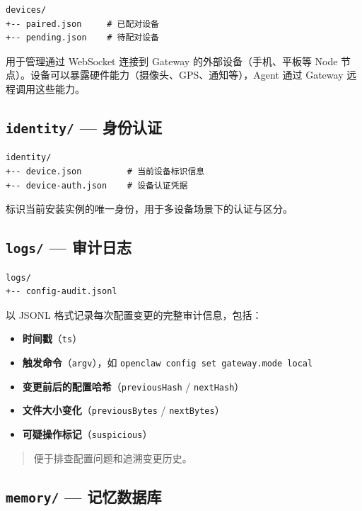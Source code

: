 \begin{lstlisting}
devices/
+-- paired.json     # 已配对设备
+-- pending.json    # 待配对设备
\end{lstlisting}

用于管理通过 WebSocket 连接到 Gateway 的外部设备（手机、平板等 Node 节点）。设备可以暴露硬件能力（摄像头、GPS、通知等），Agent 通过 Gateway 远程调用这些能力。

\subsection{\texttt{identity/} --- 身份认证}


\begin{lstlisting}
identity/
+-- device.json         # 当前设备标识信息
+-- device-auth.json    # 设备认证凭据
\end{lstlisting}

标识当前安装实例的唯一身份，用于多设备场景下的认证与区分。

\subsection{\texttt{logs/} --- 审计日志}


\begin{lstlisting}
logs/
+-- config-audit.jsonl
\end{lstlisting}

以 JSONL 格式记录每次配置变更的完整审计信息，包括：

\begin{itemize}
  \item \textbf{时间戳}（\texttt{ts}）
  \item \textbf{触发命令}（\texttt{argv}），如 \texttt{openclaw config set gateway.mode local}
  \item \textbf{变更前后的配置哈希}（\texttt{previousHash} / \texttt{nextHash}）
  \item \textbf{文件大小变化}（\texttt{previousBytes} / \texttt{nextBytes}）
  \item \textbf{可疑操作标记}（\texttt{suspicious}）
\end{itemize}

\begin{quote}
便于排查配置问题和追溯变更历史。
\end{quote}

\subsection{\texttt{memory/} --- 记忆数据库}


